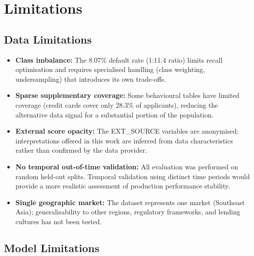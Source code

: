 \section{Limitations}
\label{sec:limitations}

\subsection{Data Limitations}

\begin{itemize}
    \item \textbf{Class imbalance:} The 8.07\% default rate (1:11.4 ratio) limits recall optimisation and requires specialised handling (class weighting, undersampling) that introduces its own trade-offs.
    \item \textbf{Sparse supplementary coverage:} Some behavioural tables have limited coverage (credit cards cover only 28.3\% of applicants), reducing the alternative data signal for a substantial portion of the population.
    \item \textbf{External score opacity:} The EXT\_SOURCE variables are anonymised; interpretations offered in this work are inferred from data characteristics rather than confirmed by the data provider.
    \item \textbf{No temporal out-of-time validation:} All evaluation was performed on random held-out splits. Temporal validation using distinct time periods would provide a more realistic assessment of production performance stability.
    \item \textbf{Single geographic market:} The dataset represents one market (Southeast Asia); generalisability to other regions, regulatory frameworks, and lending cultures has not been tested.
\end{itemize}

\subsection{Model Limitations}

